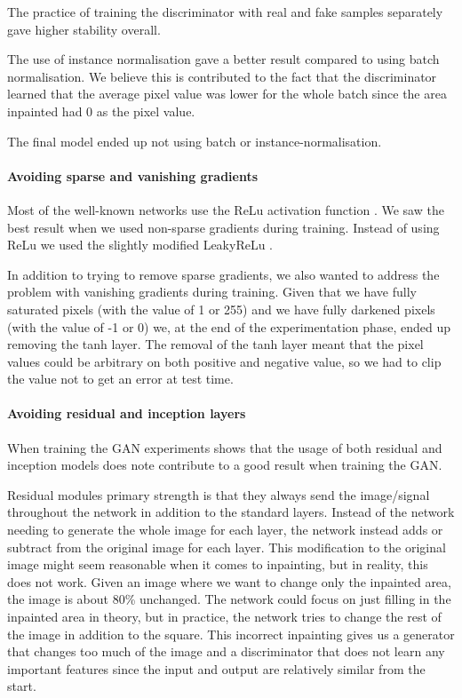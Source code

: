 The practice of training the discriminator with real and fake samples separately gave higher stability overall. 

The use of instance normalisation gave a better result compared to using batch normalisation. We believe this is contributed to the fact that the discriminator learned that the average pixel value was lower for the whole batch since the area inpainted had 0 as the pixel value.

The final model ended up not using batch or instance-normalisation. 



\paragraph{Avoiding sparse and vanishing gradients}
Most of the well-known networks use the ReLu\cite{Nair/2010/RLU/3104322.3104425} activation function \cite{DBLP:journals/corr/SimonyanZ14a} \cite{DBLP:journals/corr/SzegedyIV16} 
\cite{DBLP:journals/corr/HeZRS15}.
We saw the best result when we used non-sparse gradients during training. 
Instead of using ReLu we used the slightly modified LeakyReLu \cite{Maas2013RectifierNI}.


In addition to trying to remove sparse gradients, we also wanted to address the problem with vanishing gradients during training. Given that we have fully saturated pixels (with the value of 1 or 255) and we have fully darkened pixels (with the value of -1 or 0) we, at the end of the experimentation phase, ended up removing the tanh layer. 
The removal of the tanh layer meant that the pixel values could be arbitrary on both positive and negative value, so we had to clip the value not to get an error at test time. 



\paragraph{Avoiding residual and inception layers}
When training the GAN experiments shows that the usage of both residual \cite{Rumelhart:1986:LIR:104279.104293} and inception \cite{DBLP:journals/corr/SzegedyLJSRAEVR14} models does note contribute to a good result when training the GAN.

Residual modules primary strength is that they always send the image/signal throughout the network in addition to the standard layers. Instead of the network needing to generate the whole image for each layer, the network instead adds or subtract from the original image for each layer.
This modification to the original image might seem reasonable when it comes to inpainting, but in reality, this does not work.  Given an image where we want to change only the inpainted area, the image is about 80\% unchanged. The network could focus on just filling in the inpainted area in theory, but in practice, the network tries to change the rest of the image in addition to the square. This incorrect inpainting gives us a generator that changes too much of the image and a discriminator that does not learn any important features since the input and output are relatively similar from the start.

